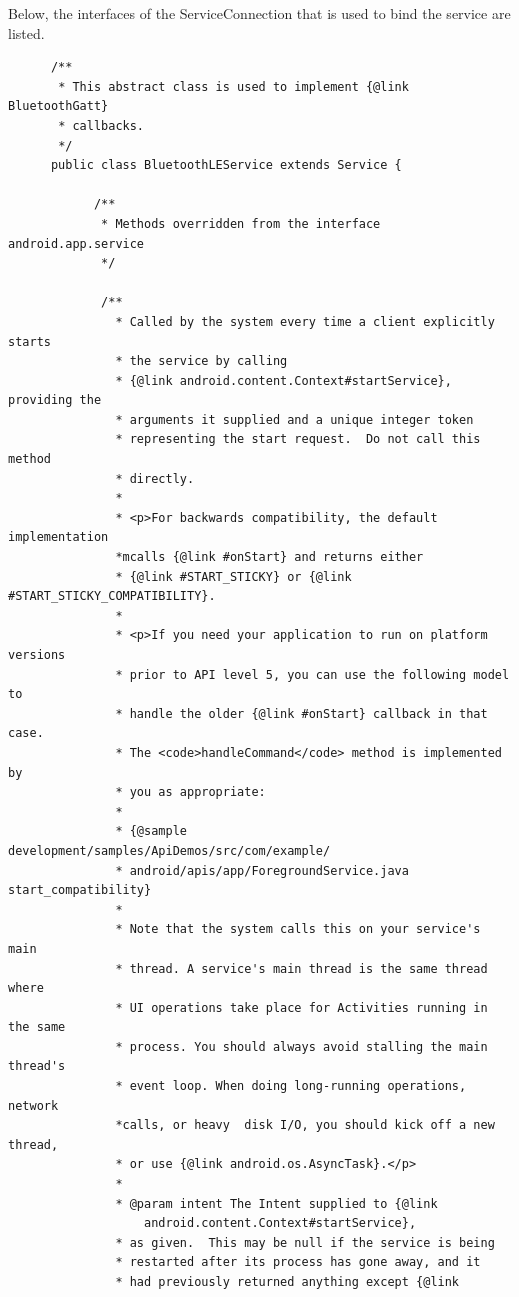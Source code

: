      Below, the interfaces of the ServiceConnection that is used to bind the service are listed.
     
  \hspace{-2cm}  \begin{lstlisting}
      /**
       * This abstract class is used to implement {@link BluetoothGatt} 
       * callbacks.
       */
      public class BluetoothLEService extends Service {

            /**
             * Methods overridden from the interface android.app.service
             */

             /**
               * Called by the system every time a client explicitly starts 
               * the service by calling
               * {@link android.content.Context#startService}, providing the 
               * arguments it supplied and a unique integer token 
               * representing the start request.  Do not call this method 
               * directly.
               *
               * <p>For backwards compatibility, the default implementation 
               *mcalls {@link #onStart} and returns either 
               * {@link #START_STICKY} or {@link #START_STICKY_COMPATIBILITY}.
               *
               * <p>If you need your application to run on platform versions 
               * prior to API level 5, you can use the following model to 
               * handle the older {@link #onStart} callback in that case.  
               * The <code>handleCommand</code> method is implemented by
               * you as appropriate:
               *
               * {@sample development/samples/ApiDemos/src/com/example/
               * android/apis/app/ForegroundService.java start_compatibility}
               *
               * Note that the system calls this on your service's main 
               * thread. A service's main thread is the same thread where 
               * UI operations take place for Activities running in the same 
               * process. You should always avoid stalling the main thread's 
               * event loop. When doing long-running operations, network 
               *calls, or heavy  disk I/O, you should kick off a new thread, 
               * or use {@link android.os.AsyncTask}.</p>
               *
               * @param intent The Intent supplied to {@link 
                   android.content.Context#startService},
               * as given.  This may be null if the service is being 
               * restarted after its process has gone away, and it 
               * had previously returned anything except {@link

\end{lstlisting}
